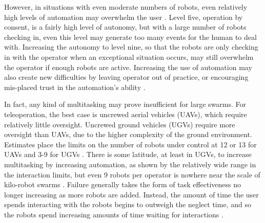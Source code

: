 However, in situations with even moderate numbers of robots, even relatively high levels of automation may overwhelm the user \citep{lewis200617}. 
Level five, operation by consent, is a fairly high level of autonomy, but with a large number of robots checking in, even this level may generate too many events for the human to deal with. 
Increasing the autonomy to level nine, so that the robots are only checking in with the operator when an exceptional situation occurs, may still overwhelm the operator if enough robots are active.
Increasing the use of automation may also create new difficulties by leaving operator out of practice, or encouraging mis-placed trust in the automation's ability \citep{lee2004trust}. 

In fact, any kind of multitasking may prove insufficient for large swarms. 
For teleoperation, the best case is uncrewed aerial vehicles (UAVs), which require relatively little oversight. 
Uncrewed ground vehicles (UGVs) require more oversight than UAVs, due to the higher complexity of the ground environment. 
Estimates place the limits on the number of robots under control at 12 or 13 for UAVs and 3-9 for UGVs \citep{WangSearchScale}.  
There is some latitude, at least in UGVs, to increase multitasking by increasing automation, as shown by the relatively wide range in the interaction limits, but even 9 robots per operator is nowhere near the scale of kilo-robot swarms  \citep{Olsen:2004:FMH:985692.985722}.
Failure generally takes the form of task effectiveness no longer increasing as more robots are added.
Instead, the amount of time the user spends interacting with the robots begins to outweigh the neglect time, and so the robots spend increasing amounts of time waiting for interactions \citep{cummings2008predicting}. 

